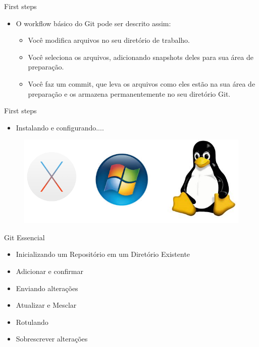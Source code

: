 \documentclass[t]{beamer}
\begin{document}
\begin{frame} {First steps}
	\begin{itemize}
		\item O workflow básico do Git pode ser descrito assim:
		\begin{itemize}
			\item Você modifica arquivos no seu diretório de trabalho.
			\item Você seleciona os arquivos, adicionando snapshots deles para sua área de preparação.
			\item Você faz um commit, que leva os arquivos como eles estão na sua área de preparação e os armazena permanentemente no seu diretório Git.
		\end{itemize}
	\end{itemize}
\end{frame}
	
\begin{frame} {First steps}
	\begin{itemize}
		\item Instalando e configurando....		
	\end{itemize}
	
	\begin{figure}[tb!]
		\centering
		\includegraphics[scale=0.6,keepaspectratio=true]{logos.png}
	\end{figure}
	
\end{frame}

\begin{frame} {Git Essencial}
	\begin{itemize}
		\item Inicializando um Repositório em um Diretório Existente
		\item Adicionar e confirmar
		\item Enviando alterações
		\item Atualizar e Mesclar
		\item Rotulando
		\item Sobrescrever alterações		
	\end{itemize}
\end{frame}
\end{document}
